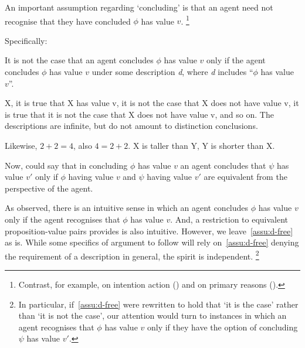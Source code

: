 \begin{note}[Descriptions]
  An important assumption regarding `concluding' is that an agent need not recognise that they have concluded \(\phi\) has value \(v\).\nolinebreak
  \footnote{
    Contrast, for example, \citeauthor{Anscombe:1957aa} on intention action (\citeyear[\S19]{Anscombe:1957aa}) and \citeauthor{Davidson:1963aa} on primary reasons (\citeyear[5]{Davidson:1963aa}).
  }

  Specifically:
  \begin{assumption}
    \label{assu:d-free}
    It is not the case that an agent concludes \(\phi\) has value \(v\) only if the agent concludes \(\phi\) has value \(v\) under some description \emph{d}, where \emph{d} includes ``\(\phi\) has value \(v\)''.
  \end{assumption}

  X, it is true that X has value v, it is not the case that X does not have value v, it is true that it is not the case that X does not have value v, and so on.
  The descriptions are infinite, but do not amount to distinction conclusions.

  Likewise, \(2 + 2 = 4\), also \(4 = 2 + 2\).
  X is taller than Y, Y is shorter than X.

  Now, could say that in concluding \(\phi\) has value \(v\) an agent concludes that \(\psi\) has value \(v'\) only if \(\phi\) having value \(v\) and \(\psi\) having value \(v'\) are equivalent from the perspective of the agent.

  As observed, there is an intuitive sense in which an agent concludes \(\phi\) has value \(v\) only if the agent recognises that \(\phi\) has value \(v\).
  And, a restriction to equivalent proposition-value pairs provides is also intuitive.
  However, we leave~\autoref{assu:d-free} as is.
  While some specifics of argument to follow will rely on~\autoref{assu:d-free} denying the requirement of a description in general, the spirit is independent.\nolinebreak
  \footnote{
    In particular, if~\autoref{assu:d-free} were rewritten to hold that `it is the case' rather than `it is not the case', our attention would turn to instances in which an agent recognises that \(\phi\) has value \(v\) only if they have the option of concluding \(\psi\) has value \(v'\).
  }


\end{note}
